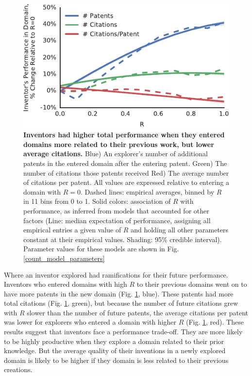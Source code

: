 \documentclass{dsj}
\begin{document}
\begin{figure}[]
\includegraphics[width=\columnwidth]{figs/patents_citations_and_citations_per_patent_with_models.pdf}
\caption{\textbf{Inventors had higher total performance when they entered domains more related to their previous work, but lower average citations.} 
Blue) An explorer's number of additional patents in the entered domain after the entering patent.
Green) The number of citations those patents received
Red) The average number of citations per patent. All values are expressed relative to entering a domain with $R=0$.
Dashed lines: empirical averages, binned by $R$ in 11 bins from 0 to 1.
Solid colors: association of $R$ with performance, as inferred from models that accounted for other factors (Line: median expectation of performance, assigning all empirical entries a given value of $R$ and holding all other parameters constant at their empirical values. Shading: 95\% credible interval). Parameter values for these models are shown in Fig. \ref{count_model_parameters}
}
\label{performance}
\end{figure}

Where an inventor explored had ramifications for their future performance.
Inventors who entered domains with high $R$ to their previous domains went on to have more patents in the new domain (Fig. \ref{performance}, blue). These patents had more total citations (Fig. \ref{performance}, green), but because the number of future citations grew with $R$ slower than the number of future patents, the average citations per patent was lower for explorers who entered a domain with higher $R$ (Fig. \ref{performance}, red). These results suggest that inventors face a performance trade-off. They are more likely to be highly productive when they explore a domain related to their prior knowledge. But the average quality of their inventions in a newly explored domain is likely to be higher if they domain is less related to their previous creations.
\end{document}
